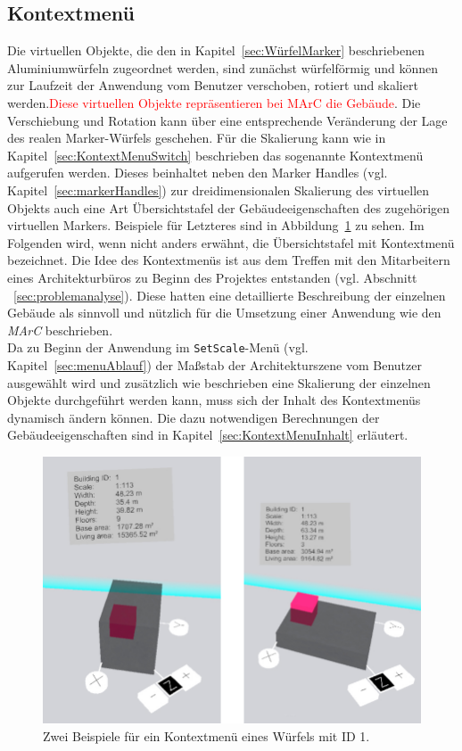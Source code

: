\subsection{Kontextmenü}\label{sec:kontextMenu}
Die virtuellen Objekte, die den in Kapitel~\ref{sec:WürfelMarker} beschriebenen Aluminiumwürfeln zugeordnet werden, sind zunächst würfelförmig und können zur Laufzeit der Anwendung vom Benutzer verschoben, rotiert und skaliert werden.\textcolor{red}{Diese virtuellen Objekte repräsentieren bei MArC die Gebäude}.  Die Verschiebung und Rotation kann über eine entsprechende Veränderung der Lage des realen Marker-Würfels geschehen. Für die Skalierung kann wie in Kapitel~\ref{sec:KontextMenuSwitch} beschrieben das sogenannte Kontextmenü aufgerufen werden. Dieses beinhaltet neben den Marker Handles (vgl. Kapitel~\ref{sec:markerHandles}) zur dreidimensionalen Skalierung des virtuellen Objekts auch eine Art Übersichtstafel der Gebäudeeigenschaften des zugehörigen virtuellen Markers. Beispiele für Letzteres sind in Abbildung~\ref{fig:KontextmenuExamples} zu sehen. Im Folgenden wird, wenn nicht anders erwähnt, die Übersichtstafel mit \glqq Kontextmenü\grqq{} bezeichnet. Die Idee des Kontextmenüs ist aus dem Treffen mit den Mitarbeitern eines Architekturbüros zu Beginn des Projektes entstanden (vgl. Abschnitt ~\ref{sec:problemanalyse}). Diese hatten eine detaillierte Beschreibung der einzelnen Gebäude als sinnvoll und nützlich für die Umsetzung einer Anwendung wie den \textit{MArC} beschrieben.\\
Da zu Beginn der Anwendung im \texttt{SetScale}-Menü (vgl. Kapitel~\ref{sec:menuAblauf}) der Maßstab der Architekturszene vom Benutzer ausgewählt wird und zusätzlich wie beschrieben eine Skalierung der einzelnen Objekte durchgeführt werden kann, muss sich der Inhalt des Kontextmenüs dynamisch ändern können. Die dazu notwendigen Berechnungen der Gebäudeeigenschaften sind in Kapitel~\ref{sec:KontextMenuInhalt} erläutert. 

\begin{figure}[H]
	\centering
	\includegraphics[scale=.3]{Bilder/Eigene Fotos/KontextMenue.jpg}
	\caption{Zwei Beispiele für ein Kontextmenü eines Würfels mit ID 1.}
	\label{fig:KontextmenuExamples}
\end{figure}

